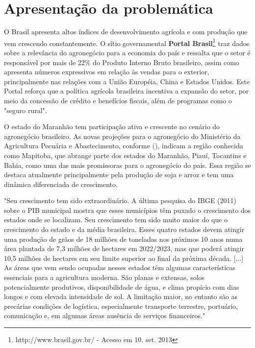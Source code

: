 \chapter{Apresentação da problemática}

O Brasil apresenta altos índices de desenvolvimento agrícola e com produção que vem crescendo constantemente. O sítio governamental \textbf{Portal Brasil}\footnote{http://www.brasil.gov.br/ - Acesso em 10. set. 2013} traz dados sobre a relevância do agronegócio para a economia do país e ressalta que o setor é responsável por mais de 22\% do Produto Interno Bruto brasileiro, assim como apresenta números expressivos em relação às vendas para o exterior, principalmente nas relações com a União Européia, China e Estados Unidos. Este Portal reforça que a política agrícola brasileira incentiva a expansão do setor, por meio da concessão de crédito e benefícios fiscais, além de programas como o "seguro rural".

O estado do Maranhão tem participação ativa e crescente no cenário do agronegócio brasileiro. As novas projeções para o agronegócio do Ministério da Agricultura Pecuária e Abastecimento, conforme \citeauthor{brministerioAgricultura2013} (\citeyear{brministerioAgricultura2013}), indicam a região conhecida como Mapitoba, que abrange parte dos estados do Maranhão, Piauí, Tocantins e Bahia, como uma das mais promissoras para o agronegócio do pais. Essa região se destaca atualmente principalmente pela produção de soja e arroz e tem uma dinâmica diferenciada de crescimento.

\begin{citacao}
"Seu crescimento tem sido extraordinário. A última pesquisa do IBGE (2011) sobre o PIB municipal mostra que esses 
municípios têm puxado o crescimento dos estados onde se localizam. Seu crescimento tem sido muito maior do que o crescimento do estado e da média brasileira. Esses quatro estados devem atingir uma produção de grãos de 18 milhões de toneladas nos próximos 10 anos numa área plantada de 7,3 milhões de hectares em 2022/2023, mas que poderá atingir 10,5 milhões de hectares em seu limite superior ao final da próxima década. [...] As áreas que vem sendo ocupadas nesses estados têm algumas características essenciais para a agricultura moderna. São planas e extensas, solos potencialmente produtivos, disponibilidade de água, e clima propício com dias longos e com elevada intensidade de sol. A limitação maior, no entanto são as precárias condições de logística, especialmente transporte terrestre, portuário, comunicação e, em algumas áreas ausência de serviços financeiros."
\cite[p. 64]{brministerioAgricultura2013}
\end{citacao}

